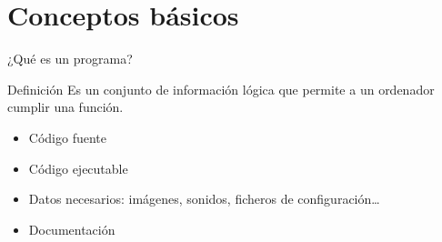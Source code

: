 \documentclass{beamer}
\begin{document}
\section[Resumen]{}



\section{Conceptos básicos}


\begin{frame}{¿Qué es un programa?}
  \begin{block}{Definición}
    Es un conjunto de información lógica que permite a un ordenador cumplir una función.
  \end{block}

  \begin{itemize}
  \item Código fuente
  \item Código ejecutable
  \item Datos necesarios: imágenes, sonidos, ficheros de         configuración\ldots
  \item Documentación 
  \end{itemize}

\end{frame}
\end{document}
